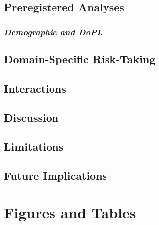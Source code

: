 \documentclass[
  donotrepeattitle,doc, 12pt, a4paper,floatsintext]{apa7}
\begin{document}
\hypertarget{preregistered-analyses-1}{%
\subsection{Preregistered Analyses}\label{preregistered-analyses-1}}

\hypertarget{demographic-and-dopl-1}{%
\subsubsection{\texorpdfstring{\emph{Demographic and DoPL}}{Demographic and DoPL}}\label{demographic-and-dopl-1}}

\hypertarget{domain-specific-risk-taking-1}{%
\subsection{Domain-Specific Risk-Taking}\label{domain-specific-risk-taking-1}}

\hypertarget{interactions-1}{%
\subsection{Interactions}\label{interactions-1}}

\hypertarget{discussion-1}{%
\subsection{Discussion}\label{discussion-1}}

\hypertarget{limitations}{%
\subsection{Limitations}\label{limitations}}

\hypertarget{future-implications}{%
\subsection{Future Implications}\label{future-implications}}

\newpage

\hypertarget{figures-and-tables}{%
\section{Figures and Tables}\label{figures-and-tables}}
\end{document}
